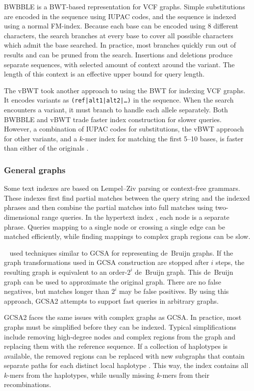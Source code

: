 BWBBLE \cite{Huang_2013} is a BWT-based representation for VCF graphs.
Simple substitutions are encoded in the sequence using IUPAC codes, and the sequence is indexed using a normal FM-index.
Because each base can be encoded using 8 different characters, the search branches at every base to cover all possible characters which admit the base searched.
In practice, most branches quickly run out of results and can be pruned from the search.
Insertions and deletions produce separate sequences, with selected amount of context around the variant.
The length of this context is an effective upper bound for query length.

The vBWT \cite{Maciuca_2016} took another approach to using the BWT for indexing VCF graphs.
It encodes variants as \texttt{(ref|alt1|alt2|\dots)} in the sequence.
When the search encounters a variant, it must branch to handle each allele separately.
Both BWBBLE and vBWT trade faster index construction for slower queries.
However, a combination of IUPAC codes for substitutions, the vBWT approach for other variants, and a $k$-mer index for matching the first 5--10 bases, is faster than either of the originals \cite{Buechler_2019}.

\subsubsection{General graphs}

Some text indexes are based on Lempel--Ziv parsing or context-free grammars.
These indexes first find partial matches between the query string and the indexed phrases and then combine the partial matches into full matches using two-dimensional range queries.
In the hypertext index \cite{Thachuk_2013}, each node is a separate phrase.
Queries mapping to a single node or crossing a single edge can be matched efficiently, while finding mappings to complex graph regions can be slow.

\citeauthor{Bowe_2012}\ \cite{Bowe_2012} used techniques similar to GCSA for representing de~Bruijn graphs.
If the graph transformations used in GCSA construction are stopped after $i$ steps, the resulting graph is equivalent to an order-$2^{i}$ de~Bruijn graph.
This de~Bruijn graph can be used to approximate the original graph.
There are no false negatives, but matches longer than $2^{i}$ may be false positives.
By using this approach, GCSA2 \cite{Siren_2017} attempts to support fast queries in arbitrary graphs.

GCSA2 faces the same issues with complex graphs as GCSA.
In practice, most graphs must be simplified before they can be indexed.
Typical simplifications include removing high-degree nodes and complex regions from the graph and replacing them with the reference sequence.
If a collection of haplotypes is available, the removed regions can be replaced with new subgraphs that contain separate paths for each distinct local haplotype \cite{Siren_2019}.
This way, the index contains all $k$-mers from the haplotypes, while usually missing $k$-mers from their recombinations.

